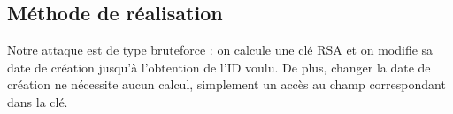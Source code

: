 \documentclass{../res/univ-projet}
\begin{document}
\subsection{Méthode de réalisation}
Notre attaque est de type bruteforce : on calcule une clé RSA et on modifie sa date de création jusqu'à l'obtention de
l'ID voulu. De plus, changer la date de création ne nécessite aucun calcul, simplement un accès au champ correspondant
dans la clé.

\end{document}
